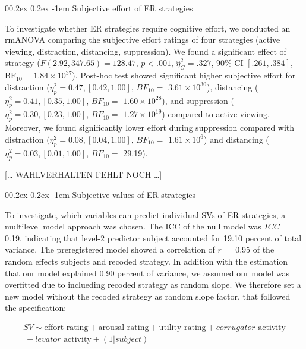 \documentclass[
  man,floatsintext]{apa6}
\makeatletter
\let\oldparagraph\paragraph
\renewcommand{\paragraph}[1]{\oldparagraph{#1}\mbox{}}
\renewcommand{\paragraph}{\@startsection{paragraph}{4}{\parindent}%
  {0\baselineskip \@plus 0.2ex \@minus 0.2ex}%
  {-1em}%
  {\normalfont\normalsize\bfseries\itshape\typesectitle}}
\makeatother
\begin{document}
\hypertarget{subjective-effort-of-er-strategies}{%
\paragraph{Subjective effort of ER strategies}\label{subjective-effort-of-er-strategies}}

To investigate whether ER strategies require cognitive effort, we conducted an rmANOVA comparing the subjective effort ratings of four strategies (active viewing, distraction, distancing, suppression).
We found a significant effect of strategy (\(F(2.92, 347.65) = 128.47\), \(p < .001\), \(\hat{\eta}^2_G = .327\), 90\% CI \([.261, .384]\), \(\mathrm{BF}_{\textrm{10}} = 1.84 \times 10^{37}\)).
Post-hoc test showed significant higher subjective effort for distraction (\(\eta_{p}^{2}=0.47, [0.42, 1.00]\), \(BF_{10}=\) \(3.61 \times 10^{30}\)), distancing (\(\eta_{p}^{2}=0.41, [0.35, 1.00]\), \(BF_{10}=\) \(1.60 \times 10^{28}\)), and suppression (\(\eta_{p}^{2}=0.30, [0.23, 1.00]\), \(BF_{10}=\) \(1.27 \times 10^{19}\)) compared to active viewing.
Moreover, we found significantly lower effort during suppression compared with distraction (\(\eta_{p}^{2}=0.08, [0.04, 1.00]\), \(BF_{10}=\) \(1.61 \times 10^{6}\)) and distancing (\(\eta_{p}^{2}=0.03, [0.01, 1.00]\), \(BF_{10}=\) 29.19).

{[}\ldots{} WAHLVERHALTEN FEHLT NOCH \ldots{]}

\hypertarget{subjective-values-of-er-strategies}{%
\paragraph{Subjective values of ER strategies}\label{subjective-values-of-er-strategies}}

To investigate, which variables can predict individual SVs of ER strategies, a multilevel model approach was chosen.
The ICC of the null model was \(ICC=\) 0.19, indicating that level-2 predictor subject accounted for 19.10 percent of total variance.
The preregistered model showed a correlation of \(r=\) 0.95 of the random effects subjects and recoded strategy.
In addition with the estimation that our model explained 0.90 percent of variance, we assumed our model was overfitted due to inclueding recoded strategy as random slope.
We therefore set a new model without the recoded strategy as random slope factor, that followed the specification:

\[
\begin{split}
SV \sim \text{effort rating} + \text{arousal rating} + \text{utility rating} + corrugator \text{ activity} \\\ + levator \text{ activity} + (1 |subject)
\end{split}
\]
\end{document}
